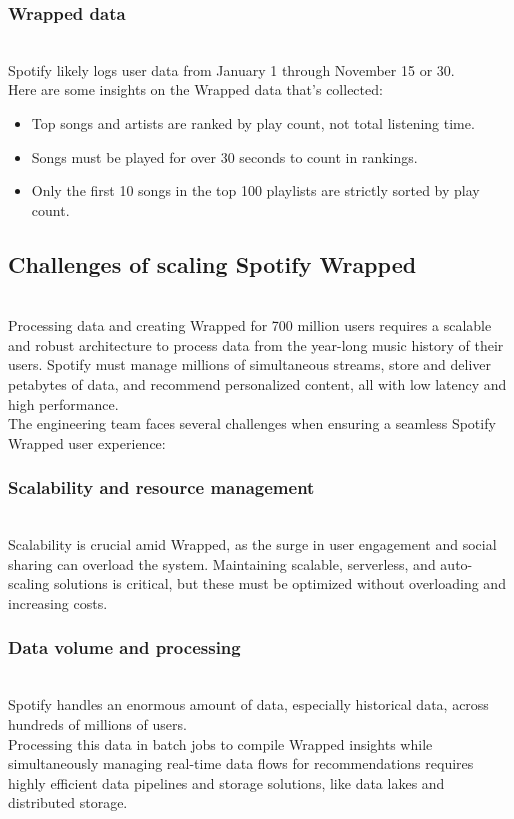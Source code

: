 \subsubsection{Wrapped data}\label{nv-lvS0ZzBGufRfJQow0p}
\\
Spotify likely logs user data from January 1 through November 15 or 30.
\\
Here are some insights on the Wrapped data that's collected:~

\begin{itemize}
\item
\protect{}\label{TgChojzE8Ggo6ECJtgaHf}
Top songs and artists are ranked by play count, not total listening time.
\item
\protect{}\label{1lhTqzXSOsB3nZlT-9rN0}
Songs must be played for over 30 seconds to count in rankings.
\item
\protect{}\label{pRYj-3WQz0ZCAuOzGpkZN}
Only the first 10 songs in the top 100 playlists are strictly sorted by play count.
\end{itemize}

\subsection{Challenges of scaling Spotify Wrapped}\label{RJe3Yqqfv1YrFLYbrelG1}
\\
Processing data and creating Wrapped for 700 million users requires a scalable and robust architecture to process data from the year-long music history of their users. Spotify must manage millions of simultaneous streams, store and deliver petabytes of data, and recommend personalized content, all with low latency and high performance.
\\
The engineering team faces several challenges when ensuring a seamless Spotify Wrapped user experience:

\subsubsection{Scalability and resource management}\label{EnM7RTkrPst8IpyyQOSUm}
\\
Scalability is crucial amid Wrapped, as the surge in user engagement and social sharing can overload the system. Maintaining scalable, serverless, and auto-scaling solutions is critical, but these must be optimized without overloading and increasing costs.

\subsubsection{Data volume and processing}\label{MI54C1z6U8JxKSIXJzlY6}
\\
Spotify handles an enormous amount of data, especially historical data, across hundreds of millions of users.
\\
Processing this data in batch jobs to compile Wrapped insights while simultaneously managing real-time data flows for recommendations requires highly efficient data pipelines and storage solutions, like data lakes and distributed storage.

